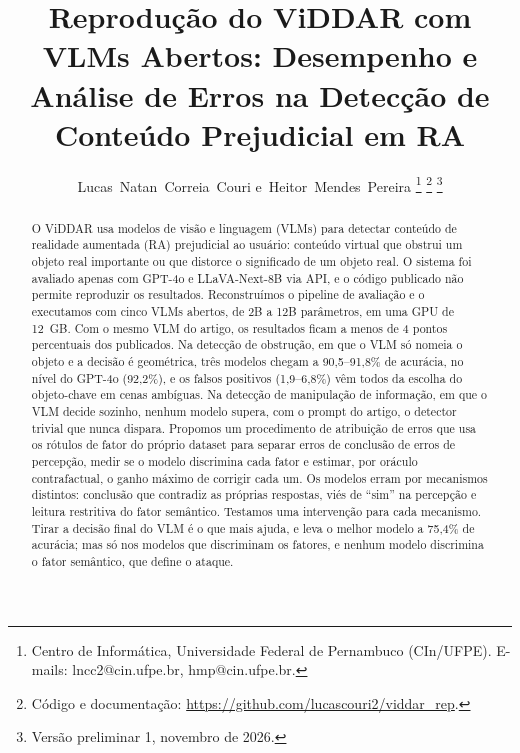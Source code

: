 \documentclass[journal,onecolumn]{IEEEtran}
\begin{document}
\title{Reprodução do ViDDAR com VLMs Abertos: Desempenho e Análise de Erros na Detecção de Conteúdo
Prejudicial em RA}

\author{Lucas~Natan~Correia~Couri
        e~Heitor~Mendes~Pereira%
\thanks{Centro de Informática, Universidade Federal de Pernambuco (CIn/UFPE).
E-mails: lncc2@cin.ufpe.br, hmp@cin.ufpe.br.}%
\thanks{Código e documentação: \url{https://github.com/lucascouri2/viddar_rep}.}%
\thanks{Versão preliminar 1, novembro de 2026.}}


\maketitle

\begin{abstract}
O ViDDAR usa modelos de visão e linguagem (VLMs) para detectar conteúdo de realidade aumentada (RA)
prejudicial ao usuário: conteúdo virtual que obstrui um objeto real importante ou que distorce o
significado de um objeto real. O sistema foi avaliado apenas com GPT-4o e LLaVA-Next-8B via API, e o
código publicado não permite reproduzir os resultados. Reconstruímos o pipeline de avaliação e o
executamos com cinco VLMs abertos, de 2B a 12B parâmetros, em uma GPU de 12~GB. Com o mesmo VLM do
artigo, os resultados ficam a menos de 4 pontos percentuais dos publicados. Na detecção de obstrução,
em que o VLM só nomeia o objeto e a decisão é geométrica, três modelos chegam a 90,5--91,8\% de
acurácia, no nível do GPT-4o (92,2\%), e os falsos positivos (1,9--6,8\%) vêm todos da escolha do
objeto-chave em cenas ambíguas. Na detecção de manipulação de informação, em que o VLM decide sozinho,
nenhum modelo supera, com o prompt do artigo, o detector trivial que nunca dispara. Propomos um
procedimento de atribuição de erros que usa os rótulos de fator do próprio dataset para separar erros de
conclusão de erros de percepção, medir se o modelo discrimina cada fator e estimar, por oráculo
contrafactual, o ganho máximo de corrigir cada um. Os modelos erram por mecanismos distintos: conclusão
que contradiz as próprias respostas, viés de ``sim'' na percepção e leitura restritiva do fator
semântico. Testamos uma intervenção para cada mecanismo. Tirar a decisão final do VLM é o que mais
ajuda, e leva o melhor modelo a 75,4\% de acurácia; mas só nos modelos que discriminam os fatores, e
nenhum modelo discrimina o fator semântico, que define o ataque.
\end{abstract}
\end{document}
